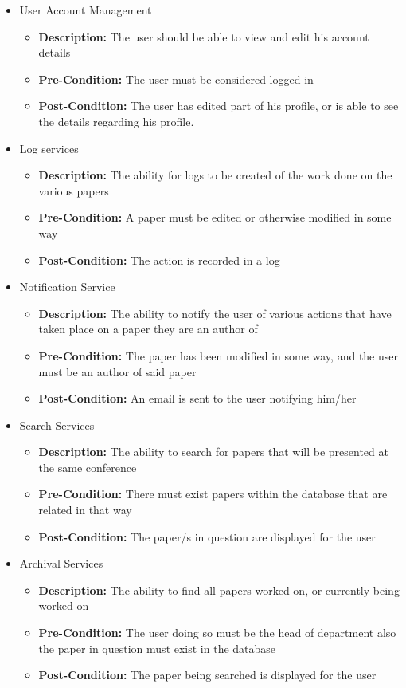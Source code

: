 \documentclass[11pt]{article}
\begin{document}
\begin{itemize}
		\item User Account Management
		\begin{itemize}
			\item \textbf{Description: }The user should be able to view and edit his account details
			\item \textbf{Pre-Condition: }The user must be considered logged in
			\item \textbf{Post-Condition: }The user has edited part of his profile, or is able to see the details regarding his profile.
		\end{itemize}
		
		\item Log services
		\begin{itemize}
			\item \textbf{Description: }The ability for logs to be created of the work done on the various papers
			\item \textbf{Pre-Condition: }A paper must be edited or otherwise modified in some way
			\item \textbf{Post-Condition: }The action is recorded in a log
		\end{itemize}
		
		\item Notification Service
		\begin{itemize}
			\item \textbf{Description: }The ability to notify the user of various actions that have taken place on a paper they are an author of
			\item \textbf{Pre-Condition: }The paper has been modified in some way, and the user must be an author of said paper
			\item \textbf{Post-Condition: }An email is sent to the user notifying him/her
		\end{itemize}
		
		\item Search Services
		\begin{itemize}
			\item \textbf{Description: }The ability to search for papers that will be presented at the same conference
			\item \textbf{Pre-Condition: }There must exist papers within the database that are related in that way
			\item \textbf{Post-Condition: }The paper/s in question are displayed for the user
		\end{itemize}
		
		\item Archival Services
		\begin{itemize}
			\item \textbf{Description: }The ability to find all papers worked on, or currently being worked on
			\item \textbf{Pre-Condition: }The user doing so must be the head of department also the paper in question must exist in the database
			\item \textbf{Post-Condition: }The paper being searched is displayed for the user
		\end{itemize}
	\end{itemize}
\end{document}
